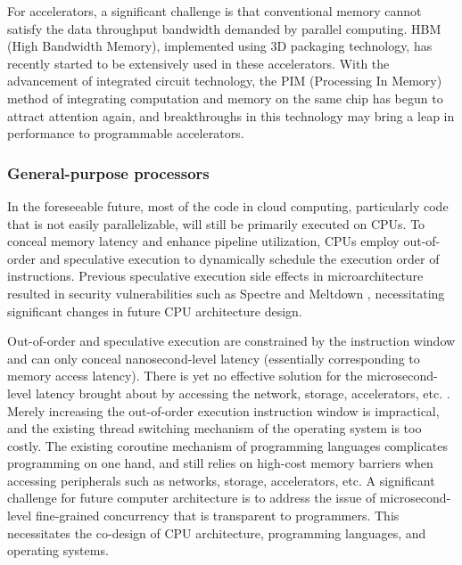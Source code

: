 For accelerators, a significant challenge is that conventional memory cannot satisfy the data throughput bandwidth demanded by parallel computing. HBM (High Bandwidth Memory), implemented using 3D packaging technology, has recently started to be extensively used in these accelerators. With the advancement of integrated circuit technology, the PIM (Processing In Memory) method of integrating computation and memory on the same chip has begun to attract attention again, and breakthroughs in this technology may bring a leap in performance to programmable accelerators.

\subsubsection{General-purpose processors}

In the foreseeable future, most of the code in cloud computing, particularly code that is not easily parallelizable, will still be primarily executed on CPUs. To conceal memory latency and enhance pipeline utilization, CPUs employ out-of-order and speculative execution to dynamically schedule the execution order of instructions. Previous speculative execution side effects in microarchitecture resulted in security vulnerabilities such as Spectre \cite{Kocher2018spectre} and Meltdown \cite{Lipp2018meltdown}, necessitating significant changes in future CPU architecture design.

Out-of-order and speculative execution are constrained by the instruction window and can only conceal nanosecond-level latency (essentially corresponding to memory access latency). There is yet no effective solution for the microsecond-level latency brought about by accessing the network, storage, accelerators, etc. \cite{barroso2017attack}. Merely increasing the out-of-order execution instruction window is impractical, and the existing thread switching mechanism of the operating system is too costly. The existing coroutine mechanism of programming languages complicates programming on one hand, and still relies on high-cost memory barriers when accessing peripherals such as networks, storage, accelerators, etc. A significant challenge for future computer architecture is to address the issue of microsecond-level fine-grained concurrency that is transparent to programmers. This necessitates the co-design of CPU architecture, programming languages, and operating systems.

